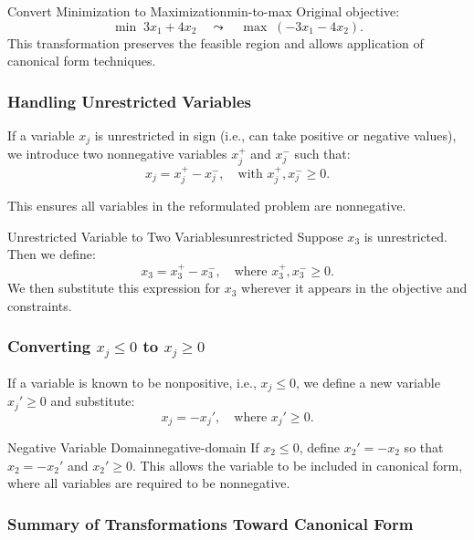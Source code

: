 \begin{example}{Convert Minimization to Maximization}{min-to-max}
Original objective:
\[
\min \; 3x_1 + 4x_2 \quad \leadsto \quad \max \; (-3x_1 - 4x_2).
\]
This transformation preserves the feasible region and allows application of canonical form techniques.
\end{example}

\subsubsection{Handling Unrestricted Variables}

If a variable \( x_j \) is unrestricted in sign (i.e., can take positive or negative values), we introduce two nonnegative variables \( x_j^+ \) and \( x_j^- \) such that:
\[
x_j = x_j^+ - x_j^-, \quad \text{with } x_j^+, x_j^- \geq 0.
\]

This ensures all variables in the reformulated problem are nonnegative.

\begin{example}{Unrestricted Variable to Two Variables}{unrestricted}
Suppose \( x_3 \) is unrestricted. Then we define:
\[
x_3 = x_3^+ - x_3^-, \quad \text{where } x_3^+, x_3^- \geq 0.
\]
We then substitute this expression for \( x_3 \) wherever it appears in the objective and constraints.
\end{example}

\subsubsection{Converting \( x_j \leq 0 \) to \( x_j \geq 0 \)}

If a variable is known to be nonpositive, i.e., \( x_j \leq 0 \), we define a new variable \( x_j' \geq 0 \) and substitute:
\[
x_j = -x_j', \quad \text{where } x_j' \geq 0.
\]

\begin{example}{Negative Variable Domain}{negative-domain}
If \( x_2 \leq 0 \), define \( x_2' = -x_2 \) so that \( x_2 = -x_2' \) and \( x_2' \geq 0 \). This allows the variable to be included in canonical form, where all variables are required to be nonnegative.
\end{example}

\subsubsection*{Summary of Transformations Toward Canonical Form}

